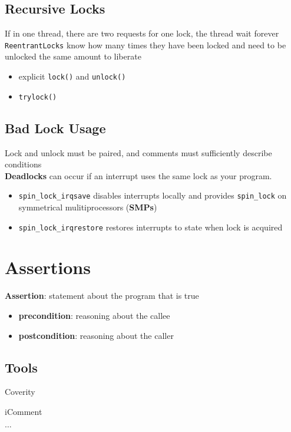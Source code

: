 \documentclass[]{article}
\theoremstyle{definition}
\begin{document}
		\subsection{Recursive Locks}
			If in one thread, there are two requests for one lock, the thread wait forever \\
			\lstinline|ReentrantLocks| know how many times they have been locked and need to be unlocked the same amount to liberate
			\begin{itemize}
				\item explicit \lstinline|lock()| and \lstinline|unlock()|
				\item \lstinline|trylock()|
			\end{itemize}
		\subsection{Bad Lock Usage}
			Lock and unlock must be paired, and comments must sufficiently describe conditions \\
			\textbf{Deadlocks} can occur if an interrupt uses the same lock as your program. 
			\begin{itemize}
				\item \lstinline|spin_lock_irqsave| disables interrupts locally and provides \lstinline|spin_lock| on symmetrical mulitiprocessors (\textbf{SMPs})
				\item \lstinline|spin_lock_irqrestore| restores interrupts to state when lock is acquired
			\end{itemize}
	\section{Assertions}
		\textbf{Assertion}: statement about the program that is true
		\begin{itemize}
			\item \textbf{precondition}: reasoning about the callee
			\item \textbf{postcondition}: reasoning about the caller
		\end{itemize}
		\subsection{Tools}
			\begin{description}
				\item Coverity
				\item iComment
				\item $\dots$
			\end{description}
\end{document}
